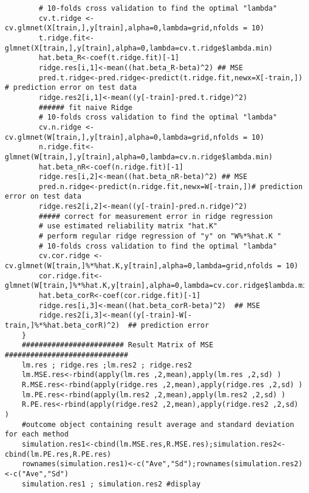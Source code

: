 \documentclass[12pt]{report}
\begin{document}
\begin{lstlisting}
		# 10-folds cross validation to find the optimal "lambda"
		cv.t.ridge <-cv.glmnet(X[train,],y[train],alpha=0,lambda=grid,nfolds = 10)
		t.ridge.fit<- glmnet(X[train,],y[train],alpha=0,lambda=cv.t.ridge$lambda.min)
		hat.beta_R<-coef(t.ridge.fit)[-1]
		ridge.res[i,1]<-mean((hat.beta_R-beta)^2) ## MSE
		pred.t.ridge<-pred.ridge<-predict(t.ridge.fit,newx=X[-train,]) # prediction error on test data
		ridge.res2[i,1]<-mean((y[-train]-pred.t.ridge)^2)
		###### fit naive Ridge
		# 10-folds cross validation to find the optimal "lambda"
		cv.n.ridge <-cv.glmnet(W[train,],y[train],alpha=0,lambda=grid,nfolds = 10)
		n.ridge.fit<- glmnet(W[train,],y[train],alpha=0,lambda=cv.n.ridge$lambda.min)
		hat.beta_nR<-coef(n.ridge.fit)[-1]
		ridge.res[i,2]<-mean((hat.beta_nR-beta)^2) ## MSE
		pred.n.ridge<-predict(n.ridge.fit,newx=W[-train,])# prediction error on test data
		ridge.res2[i,2]<-mean((y[-train]-pred.n.ridge)^2)
		##### correct for measurement error in ridge regression
		# use estimated reliability matrix "hat.K" 
		# perform regular ridge regression of "y" on "W%*%hat.K "
		# 10-folds cross validation to find the optimal "lambda"
		cv.cor.ridge <-cv.glmnet(W[train,]%*%hat.K,y[train],alpha=0,lambda=grid,nfolds = 10)
		cor.ridge.fit<- glmnet(W[train,]%*%hat.K,y[train],alpha=0,lambda=cv.cor.ridge$lambda.min)
		hat.beta_corR<-coef(cor.ridge.fit)[-1]
		ridge.res[i,3]<-mean((hat.beta_corR-beta)^2)  ## MSE
		ridge.res2[i,3]<-mean((y[-train]-W[-train,]%*%hat.beta_corR)^2)  ## prediction error
	}
	######################## Result Matrix of MSE #############################
	lm.res ; ridge.res ;lm.res2 ; ridge.res2
	lm.MSE.res<-rbind(apply(lm.res ,2,mean),apply(lm.res ,2,sd) )
	R.MSE.res<-rbind(apply(ridge.res ,2,mean),apply(ridge.res ,2,sd) )
	lm.PE.res<-rbind(apply(lm.res2 ,2,mean),apply(lm.res2 ,2,sd) )
	R.PE.res<-rbind(apply(ridge.res2 ,2,mean),apply(ridge.res2 ,2,sd) )
	#outcome object containing result average and standard deviation for each method
	simulation.res1<-cbind(lm.MSE.res,R.MSE.res);simulation.res2<-cbind(lm.PE.res,R.PE.res)
	rownames(simulation.res1)<-c("Ave","Sd");rownames(simulation.res2)<-c("Ave","Sd")
	simulation.res1 ; simulation.res2 #display
\end{lstlisting}


\end{document}
